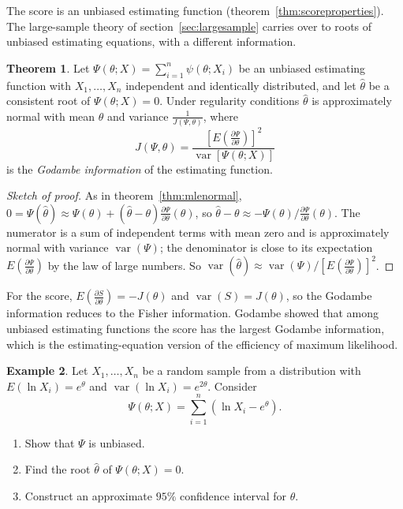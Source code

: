 \documentclass[12pt,a4paper]{report}
\theoremstyle{definition}
\newtheorem{thm}{Theorem}[section]
\newtheorem{exa}[thm]{Example}
\DeclareMathOperator{\var}{var}
\begin{document}
The score is an unbiased estimating function (theorem~\ref{thm:scoreproperties}).
The large-sample theory of section~\ref{sec:largesample} carries over to roots of
unbiased estimating equations, with a different information.

\begin{thm}
\label{thm:godambe}
Let $\Psi(\theta; X) = \sum_{i=1}^n\psi(\theta; X_i)$ be an unbiased estimating function
with $X_1, \dots, X_n$ independent and identically distributed, and let $\hat\theta$ be
a consistent root of $\Psi(\theta; X) = 0$. Under regularity conditions $\hat\theta$ is
approximately normal with mean $\theta$ and variance $\frac{1}{J(\Psi, \theta)}$, where
\[J(\Psi, \theta) = \frac{\left[E\left(\frac{\partial\Psi}{\partial\theta}\right)\right]^2}{\var\left[\Psi(\theta; X)\right]}\]
is the \emph{Godambe information} of the estimating function.
\end{thm}

\begin{proof}[Sketch of proof]
As in theorem~\ref{thm:mlenormal}, $0 = \Psi(\hat\theta) \approx \Psi(\theta) +
(\hat\theta - \theta)\frac{\partial\Psi}{\partial\theta}(\theta)$, so
$\hat\theta - \theta\approx -\Psi(\theta)\big/\frac{\partial\Psi}{\partial\theta}(\theta)$. The
numerator is a sum of independent terms with mean zero and is approximately normal
with variance $\var(\Psi)$; the denominator is close to its expectation
$E\left(\frac{\partial\Psi}{\partial\theta}\right)$ by the law of large numbers. So
$\var(\hat\theta)\approx\var(\Psi)\big/\left[E\left(\frac{\partial\Psi}{\partial\theta}\right)\right]^2$.
\end{proof}

For the score, $E\left(\frac{\partial S}{\partial\theta}\right) = -J(\theta)$ and
$\var(S) = J(\theta)$, so the Godambe information reduces to the Fisher information.
Godambe showed that among unbiased estimating functions the score has the largest
Godambe information, which is the estimating-equation version of the efficiency of
maximum likelihood.

\begin{exa}
\label{ex:eelog}
Let $X_1, \dots, X_n$ be a random sample from a distribution with
$E(\ln X_i) = e^\theta$ and $\var(\ln X_i) = e^{2\theta}$. Consider
\[\Psi(\theta; X) = \sum^n_{i = 1}\left(\ln X_i - e^\theta\right).\]
\begin{enumerate}
\item[(a)] Show that $\Psi$ is unbiased.
\item[(b)] Find the root $\hat\theta$ of $\Psi(\theta; X) = 0$.
\item[(c)] Construct an approximate $95\%$ confidence interval for $\theta$.
\end{enumerate}
\end{exa}
\end{document}
